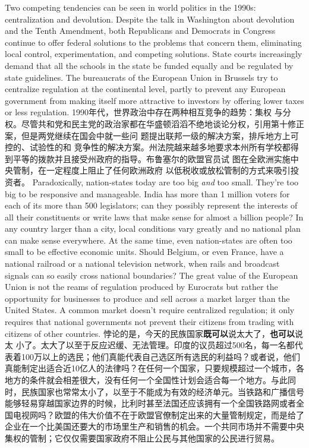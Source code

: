\begin{paracol}{2}
Two competing tendencies can be seen in world politics in the
1990s: centralization and devolution. Despite the talk in Washington about devolution and the Tenth Amendment, both Republicans and Democrats in Congress continue to offer federal
solutions to the problems that concern them, eliminating local
control, experimentation, and competing solutions. State
courts increasingly demand that all the schools in the state be
funded equally and be regulated by state guidelines. The bureaucrats of the European Union in Brussels try to centralize regulation at the continental level, partly to prevent any European government from making itself more attractive to investors by offering lower taxes or less regulation.
\switchcolumn
1990年代，世界政治中存在两种相互竞争的趋势：集权
与分权。尽管共和党和民主党的政治家都在华盛顿滔滔不绝地谈论分权，引用第十修正案，但是两党继续在国会中就一些问
题提出联邦一级的解决方案，排斥地方上可控的、试验性的和
竞争性的解决方案。州法院越来越多地要求本州所有学校都得
到平等的拨款并且接受州政府的指导。布鲁塞尔的欧盟官员试
图在全欧洲实施中央管制，在一定程度上阻止了任何欧洲政府
以低税收或放松管制的方式来吸引投资者。
\switchcolumn*
Paradoxically, nation-states today are too big \textit{and} too small.
They're too big to be responsive and manageable. India has
more than 1 million voters for each of its more than 500 legislators; can they possibly represent the interests of all their constituents or write laws that make sense for almost a billion
people? In any country larger than a city, local conditions vary
greatly and no national plan can make sense everywhere. At the
same time, even nation-states are often too small to be effective
economic units. Should Belgium, or even France, have a national railroad or a national television network, when rails and
broadcast signals can so easily cross national boundaries? The
great value of the European Union is not the reams of regulation produced by Eurocrats but rather the opportunity for businesses to produce and sell across a market larger than the
United States. A common market doesn't require centralized
regulation; it only requires that national governments not prevent their citizens from trading with citizens of other countries.
\switchcolumn
悖论的是，今天的民族国家\textbf{既可以}说太大了，\textbf{也可以}说太
小了。太大了以至于反应迟缓、无法管理。印度的议员超过500名，每一名都代表着100万以上的选民；他们真能代表自己选区所有选民的利益吗？或者说，他们真能制定出适合近10亿人的法律吗？在任何一个国家，只要规模超过一个城市，各地方的条件就会相差很大，没有任何一个全国性计划会适合每一个地方。与此同时，民族国家也常常太小了，以至于不能成为有效的经济单元。当铁路和广播信号能够轻易穿越国家边界的时候，比利时甚至法国还应该拥有一个全国铁路网或者全国电视网吗？欧盟的伟大价值不在于欧盟官僚制定出来的大量管制规定，而是给了企业在一个比美国还要大的市场里生产和销售的机会。一个共同市场并不需要中央集权的管制；它仅仅需要国家政府不阻止公民与其他国家的公民进行贸易。

\end{paracol}
